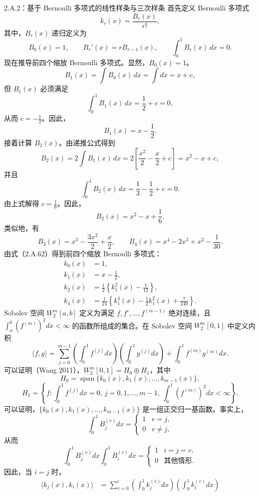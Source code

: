 \begin{bookexample}{2.A.2：基于 Bernoulli 多项式的线性样条与三次样条}
首先定义 Bernoulli 多项式
\begin{equation}
k_r(x)=\frac{B_r(x)}{r!},\tag{2.A.62}
\end{equation}
其中，$B_r(x)$ 递归定义为
\[
B_0(x)=1,\qquad
B_r'(x)=rB_{r-1}(x),\qquad
\int_0^1B_r(x)\,dx=0.
\]
现在推导前四个缩放 Bernoulli 多项式。显然，$B_0(x)=1$。
\[
B_1(x)=\int B_0(x)\,dx=\int dx=x+c,
\]
但 $B_1(x)$ 必须满足
\[
\int_0^1B_1(x)\,dx=\frac12+c=0,
\]
从而 $c=-\frac12$。因此，
\[
B_1(x)=x-\frac12.
\]
接着计算 $B_2(x)$。由递推公式得到
\[
B_2(x)=2\int B_1(x)\,dx
 =2\left[\frac{x^2}{2}-\frac x2+c\right]=x^2-x+c,
\]
并且
\[
\int_0^1B_2(x)\,dx=\frac13-\frac12+c=0.
\]
由上式解得 $c=\frac16$。因此，
\[
B_2(x)=x^2-x+\frac16.
\]
类似地，有
\[
B_3(x)=x^3-\frac{3x^2}{2}+\frac x2,
\qquad
B_4(x)=x^4-2x^3+x^2-\frac1{30}.
\]
由式（2.A.62）得到前四个缩放 Bernoulli 多项式：
\[
\begin{aligned}
k_0(x)&=1,\\
k_1(x)&=x-\frac12,\\
k_2(x)&=\frac12\left\{k_1^2(x)-\frac1{12}\right\},\\
k_4(x)&=\frac1{24}\left\{k_1^4(x)-\frac12k_1^2(x)+\frac7{240}\right\}.
\end{aligned}
\]
Sobolev 空间 $W_2^m[a,b]$ 定义为满足 $f,f',\ldots,f^{(m-1)}$ 绝对连续，且 $\int_a^b(f^{(m)})^2dx<\infty$ 的函数所组成的集合。在 Sobolev 空间 $W_2^m[0,1]$ 中定义内积
\[
\langle f,g\rangle
 =\sum_{j=0}^{m-1}
  \left(\int_0^1f^{(j)}dx\right)
  \left(\int_0^1g^{(j)}dx\right)
  +\int_0^1f^{(m)}g^{(m)}dx.
\]
可以证明（Wang 2011），$W_2^m[0,1]=H_0\oplus H_1$，其中
\[
H_0=\operatorname{span}\{k_0(x),k_1(x),\ldots,k_{m-1}(x)\},
\]
\[
H_1=\left\{f:\int_0^1f^{(j)}dx=0,\ j=0,1,\ldots,m-1,\
              \int_0^1(f^{(m)})^2dx<\infty\right\}.
\]
可以证明，$\{k_0(x),k_1(x),\ldots,k_{m-1}(x)\}$ 是一组正交归一基函数。事实上，
\[
\int_0^1B_j^{(v)}dx=
\begin{cases}1&v=j,\\0&v\ne j,\end{cases}
\]
从而
\[
\int_0^1B_j^{(v)}dx\int_0^1B_i^{(v)}dx=
\begin{cases}1&i=j=v,\\0&\text{其他情形}.\end{cases}
\]
因此，当 $i=j$ 时，
\[
\begin{aligned}
\langle k_j(x),k_i(x)\rangle
 &=\sum_{v=0}^i
   \left(\int_0^1k_j^{(v)}dx\right)
   \left(\int_0^1k_i^{(v)}dx\right)\\

\end{aligned}\]
\end{bookexample}
